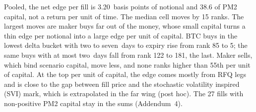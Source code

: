 \documentclass[a4paper,fleqn]{cas-dc}
\begin{document}
Pooled, the net edge per fill is 3.20~basis points of notional and 38.6 of PM2 capital, not a return per unit
of time. The median cell moves by 15 ranks. The largest moves are maker buys far out of the money, whose small
capital turns a thin edge per notional into a large edge per unit of capital. BTC buys in the lowest delta
bucket with two to seven~days to expiry rise from rank 85 to 5; the same buys with at most two~days fall from
rank 122 to 181, the last. Maker sells, which bind scenario capital, move less, and none ranks higher than
55th per unit of capital. At the top per unit of capital, the edge comes mostly from RFQ legs and is close to
the gap between fill price and the stochastic volatility inspired (SVI) mark, which is extrapolated in the far
wing (post hoc). The 27 fills with non-positive PM2 capital stay in the sums (Addendum~4).
\end{document}
